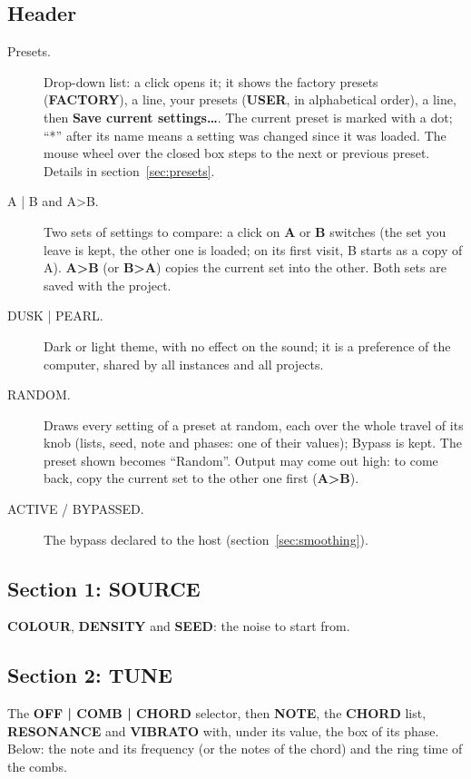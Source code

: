 \documentclass[a4paper,11pt]{article}
\newcommand{\ctl}[1]{\textsf{\textbf{#1}}}   %
\begin{document}
\subsection{Header}
\begin{description}
\item[Presets.] Drop-down list: a click opens it; it shows the factory presets (\ctl{FACTORY}), a
  line, your presets (\ctl{USER}, in alphabetical order), a line, then \ctl{Save current
  settings\ldots}. The current preset is marked with a dot; ``*'' after its name means a setting
  was changed since it was loaded. The mouse wheel over the closed box steps to the next or
  previous preset. Details in section~\ref{sec:presets}.
\item[A | B and A>B.] Two sets of settings to compare: a click on \ctl{A} or \ctl{B} switches (the
  set you leave is kept, the other one is loaded; on its first visit, B starts as a copy of A).
  \ctl{A>B} (or \ctl{B>A}) copies the current set into the other. Both sets are saved with the
  project.
\item[DUSK | PEARL.] Dark or light theme, with no effect on the sound; it is a preference of the
  computer, shared by all instances and all projects.
\item[RANDOM.] Draws every setting of a preset at random, each over the whole travel of its knob
  (lists, seed, note and phases: one of their values); Bypass is kept. The preset shown becomes
  ``Random''. Output may come out high: to come back, copy the current set to the other one
  first (\ctl{A>B}).
\item[ACTIVE / BYPASSED.] The bypass declared to the host (section~\ref{sec:smoothing}).
\end{description}

\subsection{Section 1: SOURCE}
\ctl{COLOUR}, \ctl{DENSITY} and \ctl{SEED}: the noise to start from.

\subsection{Section 2: TUNE}
The \ctl{OFF | COMB | CHORD} selector, then \ctl{NOTE}, the \ctl{CHORD} list, \ctl{RESONANCE} and
\ctl{VIBRATO} with, under its value, the box of its phase. Below: the note and its frequency (or
the notes of the chord) and the ring time of the combs.
\end{document}
